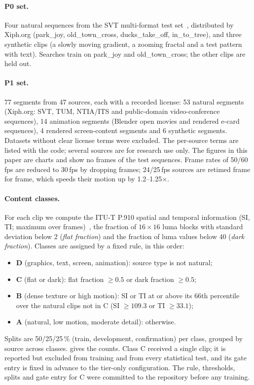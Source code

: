 \paragraph{P0 set.}
Four natural sequences from the SVT multi-format test set~\cite{haglund2006svt}, distributed by
Xiph.org (park\_joy, old\_town\_cross, ducks\_take\_off, in\_to\_tree), and three synthetic clips
(a slowly moving gradient, a zooming fractal and a test pattern with text). Searches train on
park\_joy and old\_town\_cross; the other clips are held out.

\paragraph{P1 set.}
77 segments from 47 sources, each with a recorded license: 53 natural segments (Xiph.org: SVT, TUM,
NTIA/ITS and public-domain video-conference sequences), 14 animation segments (Blender open movies
and rendered e-card sequences), 4 rendered screen-content segments and 6 synthetic segments.
Datasets without clear license terms were excluded. The per-source terms are listed with the code;
several sources are for research use only. The figures in this paper are charts and show no frames
of the test sequences. 
Frame rates of 50/60\,fps are reduced to 30\,fps by dropping frames; 24/25\,fps sources are
retimed frame for frame, which speeds their motion up by 1.2--1.25$\times$.

\paragraph{Content classes.}
For each clip we compute the ITU-T P.910 spatial and temporal information (SI, TI; maximum over
frames)~\cite{itup910}, the fraction of $16\times16$ luma blocks with standard deviation below 2
(\emph{flat fraction}) and the fraction of luma values below 40 (\emph{dark fraction}). Classes are
assigned by a fixed rule, in this order:
\begin{itemize}
  \item \textbf{D} (graphics, text, screen, animation): source type is not natural;
  \item \textbf{C} (flat or dark): flat fraction $\ge 0.5$ or dark fraction $\ge 0.5$;
  \item \textbf{B} (dense texture or high motion): SI or TI at or above its 66th percentile over the
        natural clips not in C (SI $\ge 109.3$ or TI $\ge 33.1$);
  \item \textbf{A} (natural, low motion, moderate detail): otherwise.
\end{itemize}
Splits are 50/25/25\,\% (train, development, confirmation) per class, grouped by source across
classes.  gives the counts. Class C received a single clip; it is reported but
excluded from training and from every statistical test, and its gate entry is fixed in advance to
the tier-only configuration. The rule, thresholds, splits and gate entry for C were committed to the
repository before any training.

